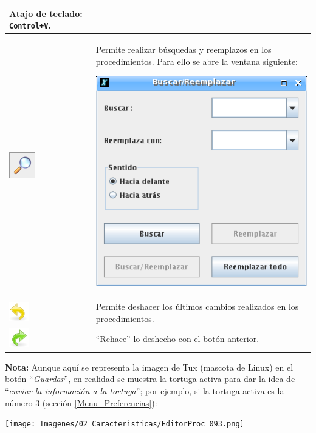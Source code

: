 \begin{center}
\begin{longtable}{|m{1.3cm}|m{115mm}|}
      Atajo de teclado: \texttt{Control+V}.\\ \hline
   \includegraphics[scale=1.0]{Imagenes/02_Caracteristicas/lupa.png}&
      Permite realizar b\'usquedas y reemplazos en los procedimientos. Para
      ello se abre la ventana siguiente:
      \begin{center}
         \includegraphics[scale=0.45]{Imagenes/02_Caracteristicas/BuscarReemplazar.png}
      \end{center} \\ \hline
   \includegraphics[scale=1.0]{Imagenes/02_Caracteristicas/undo.png}&
      Permite deshacer los \'ultimos cambios realizados en los procedimientos.\\ \hline
   \includegraphics[scale=1.0]{Imagenes/02_Caracteristicas/redo.png}&
      ``Rehace'' lo deshecho con el bot\'on anterior.\\ \hline
\end{longtable} \end{center}

\textbf{Nota:} Aunque aqu\'i se representa la imagen de Tux (mascota de Linux) en el
bot\'on ``\textit{Guardar}'', en realidad se muestra la tortuga activa para dar la
idea de ``\textit{enviar la informaci\'on a la tortuga}''; por ejemplo, si la tortuga
activa es la n\'umero 3 (secci\'on \ref{Menu_Preferencias}):
\begin{center}
   \texttt{[image: Imagenes/02\_Caracteristicas/EditorProc\_093.png]}
\end{center}

